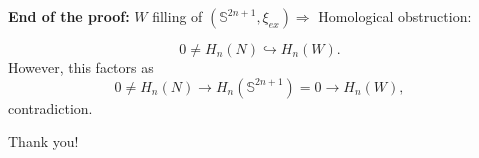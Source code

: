\documentclass{beamer}
\begin{document}
\begin{frame}

\textbf{End of the proof:} $W$ filling of $(\mathbb S^{2n+1},\xi_{ex}) \Rightarrow$ Homological obstruction: 

$$
0\neq H_n(N) \hookrightarrow H_n(W).
$$
However, this factors as
$$
0\neq H_n(N) \rightarrow H_n(\mathbb S^{2n+1})=0 \rightarrow H_n(W),
$$
contradiction.
\end{frame}

\begin{frame}
\centering
Thank you!
    
\end{frame}
\end{document}
